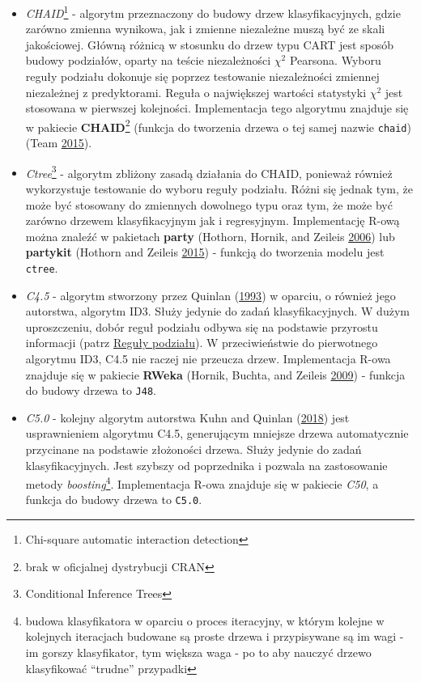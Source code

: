 \documentclass[
]{book}
\providecommand{\tightlist}{%
  \setlength{\itemsep}{0pt}\setlength{\parskip}{0pt}}
\theoremstyle{plain}
\theoremstyle{definition}
\theoremstyle{definition}
\theoremstyle{definition}
\theoremstyle{definition}
\theoremstyle{remark}
\begin{document}
\begin{itemize}
\tightlist
\item
  \emph{CHAID}\footnote{Chi-square automatic interaction detection} - algorytm przeznaczony do budowy drzew klasyfikacyjnych, gdzie zarówno zmienna wynikowa, jak i zmienne niezależne muszą być ze skali jakościowej. Główną różnicą w stosunku do drzew typu CART jest sposób budowy podziałów, oparty na teście niezależności \(\chi^2\) Pearsona. Wyboru reguły podziału dokonuje się poprzez testowanie niezależności zmiennej niezależnej z predyktorami. Reguła o największej wartości statystyki \(\chi^2\) jest stosowana w pierwszej kolejności. Implementacja tego algorytmu znajduje się w pakiecie \textbf{CHAID}\footnote{brak w oficjalnej dystrybucji CRAN} (funkcja do tworzenia drzewa o tej samej nazwie \texttt{chaid}) (Team \protect\hyperlink{ref-R-CHAID}{2015}).
\item
  \emph{Ctree}\footnote{Conditional Inference Trees} - algorytm zbliżony zasadą działania do CHAID, ponieważ również wykorzystuje testowanie do wyboru reguły podziału. Różni się jednak tym, że może być stosowany do zmiennych dowolnego typu oraz tym, że może być zarówno drzewem klasyfikacyjnym jak i regresyjnym. Implementację R-ową można znaleźć w pakietach \textbf{party} (Hothorn, Hornik, and Zeileis \protect\hyperlink{ref-R-party}{2006}) lub \textbf{partykit} (Hothorn and Zeileis \protect\hyperlink{ref-R-partykit}{2015}) - funkcją do tworzenia modelu jest \texttt{ctree}.
\item
  \emph{C4.5} - algorytm stworzony przez Quinlan (\protect\hyperlink{ref-quinlan1993}{1993}) w oparciu, o również jego autorstwa, algorytm ID3. Służy jedynie do zadań klasyfikacyjnych. W dużym uproszczeniu, dobór reguł podziału odbywa się na podstawie przyrostu informacji (patrz \protect\hyperlink{reguux142y-podziaux142u}{Reguły podziału}). W przeciwieństwie do pierwotnego algorytmu ID3, C4.5 nie raczej nie przeucza drzew. Implementacja R-owa znajduje się w pakiecie \textbf{RWeka} (Hornik, Buchta, and Zeileis \protect\hyperlink{ref-R-Rweka}{2009}) - funkcja do budowy drzewa to \texttt{J48}.
\item
  \emph{C5.0} - kolejny algorytm autorstwa Kuhn and Quinlan (\protect\hyperlink{ref-R-C50}{2018}) jest usprawnieniem algorytmu C4.5, generującym mniejsze drzewa automatycznie przycinane na podstawie złożoności drzewa. Służy jedynie do zadań klasyfikacyjnych. Jest szybszy od poprzednika i pozwala na zastosowanie metody \emph{boosting}\footnote{budowa klasyfikatora w oparciu o proces iteracyjny, w którym kolejne w kolejnych iteracjach budowane są proste drzewa i przypisywane są im wagi - im gorszy klasyfikator, tym większa waga - po to aby nauczyć drzewo klasyfikować ``trudne'' przypadki}. Implementacja R-owa znajduje się w pakiecie \emph{C50}, a funkcja do budowy drzewa to \texttt{C5.0}.
\end{itemize}
\end{document}
